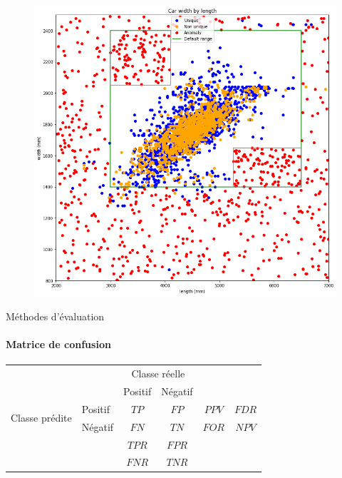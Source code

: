 \documentclass{beamer}
\begin{document}
\begin{frame}
\begin{figure}
\centering
\includegraphics[width=.8\textwidth]{img/first_try.png}
\end{figure}
\end{frame}

\begin{frame}{Méthodes d'évaluation}
\framesubtitle{Matrice de confusion}

\begin{tabular}{ l | l | c | c | c c}
\multicolumn{2}{c}{} & \multicolumn{2}{c}{Classe réelle} & \\
\cline{3-4}
\multicolumn{2}{c|}{} & Positif & Négatif \\
\cline{2-4}
\multirow{2}{*}{Classe prédite} & Positif & $TP$ & $FP$ & $PPV$ & $FDR$ \\
\cline{2-4}
& Négatif & $FN$ & $TN$ & $FOR$ & $NPV$ \\
\cline{2-4}
\multicolumn{1}{r}{} & \multicolumn{1}{l}{} & \multicolumn{1}{c}{$TPR$} & \multicolumn{1}{c}{$FPR$} \\
\multicolumn{1}{l}{} & \multicolumn{1}{l}{} & \multicolumn{1}{c}{$FNR$} & \multicolumn{1}{c}{$TNR$} \\
\end{tabular}

\end{frame}
\end{document}
